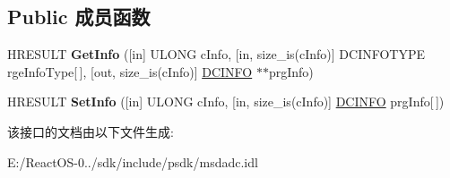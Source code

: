 \subsection*{Public 成员函数}
\begin{DoxyCompactItemize}
\item 
\mbox{\label{interface_i_d_c_info_a2de74232ab7981bf8a8c2e52e227bbcf}} 
H\+R\+E\+S\+U\+LT {\bfseries Get\+Info} (\mbox{[}in\mbox{]} U\+L\+O\+NG c\+Info, \mbox{[}in, size\+\_\+is(c\+Info)\mbox{]} D\+C\+I\+N\+F\+O\+T\+Y\+PE rge\+Info\+Type\mbox{[}$\,$\mbox{]}, \mbox{[}out, size\+\_\+is(c\+Info)\mbox{]} \hyperlink{struct_i_d_c_info_1_1tag_d_c_i_n_f_o}{D\+C\+I\+N\+FO} $\ast$$\ast$prg\+Info)
\item 
\mbox{\label{interface_i_d_c_info_acacfb058d74c71994ae319584717402d}} 
H\+R\+E\+S\+U\+LT {\bfseries Set\+Info} (\mbox{[}in\mbox{]} U\+L\+O\+NG c\+Info, \mbox{[}in, size\+\_\+is(c\+Info)\mbox{]} \hyperlink{struct_i_d_c_info_1_1tag_d_c_i_n_f_o}{D\+C\+I\+N\+FO} prg\+Info\mbox{[}$\,$\mbox{]})
\end{DoxyCompactItemize}


该接口的文档由以下文件生成\+:\begin{DoxyCompactItemize}
\item 
E\+:/\+React\+O\+S-\/0../sdk/include/psdk/msdadc.\+idl\end{DoxyCompactItemize}
